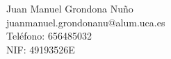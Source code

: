 Juan Manuel Grondona Nuño \\ %
juanmanuel.grondonanu@alum.uca.es \\ %
Teléfono: 656485032 \\ %
NIF: 49193526E \\ %
